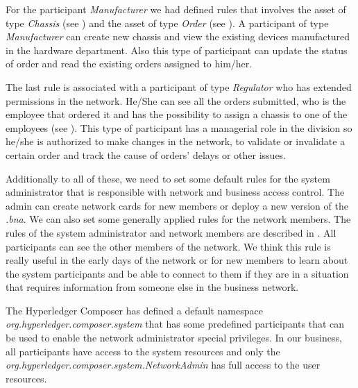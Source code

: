 For the participant \emph{Manufacturer} we had defined rules that involves the asset of type \emph{Chassis} (see ) and the asset of type \emph{Order} (see ). A participant of type \emph{Manufacturer} can create new chassis and view the existing devices manufactured in the hardware department. Also this type of participant can update the status of order and read the existing orders assigned to him/her.



The last rule is associated with a participant of type \emph{Regulator} who has extended permissions in the network. He/She can see all the orders submitted, who is the employee that ordered it and has the possibility to assign a chassis to one of the employees (see ). This type of participant has a managerial role in the division so he/she is authorized to make changes in the network, to validate or invalidate a certain order and track the cause of orders' delays or other issues.


Additionally to all of these, we need to set some default rules for the system administrator that is responsible with network and business access control.  The admin can create network cards for new members or deploy a new version of the \emph{.bna}. We can also set some generally applied rules for the network members. The rules of the system administrator and network members are described in . All participants can see the other members of the network. We think this rule is really useful in the early days of the network or for new members to learn about the system participants and be able to connect to them if they are in a situation that requires information from someone else in the business network. 

The Hyperledger Composer has defined a default namespace \emph{org.hyperledger.composer.system} that has some predefined participants that can be used to enable the network administrator special privileges. In our business, all participants have access to the system resources and only the \emph{org.hyperledger.composer.system.NetworkAdmin} has full access to the user resources.

